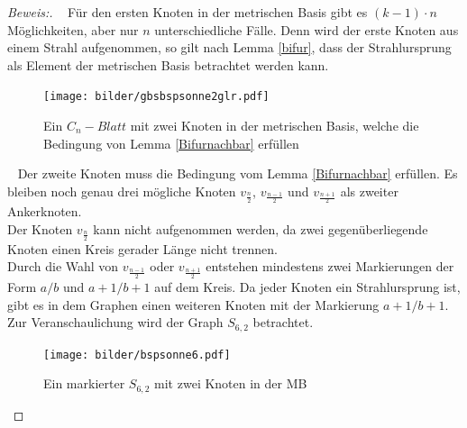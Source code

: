 \begin{proof}[Beweis:]~
Für den ersten Knoten in der metrischen Basis gibt es $(k-1)\cdot n$ Möglichkeiten, aber nur $n$ unterschiedliche Fälle. Denn wird der erste Knoten aus einem Strahl aufgenommen, so gilt nach Lemma \ref{bifur}, dass der Strahlursprung als Element der metrischen Basis betrachtet werden kann.\\
\vspace{-8mm}
 \begin{figure}[h!]
		\centering
 		 \texttt{[image: bilder/gbsbspsonne2glr.pdf]}
   \caption{Ein $C_{n}-Blatt$ mit zwei Knoten in der metrischen Basis, welche die Bedingung von Lemma \ref{Bifurnachbar} erfüllen}
  	 \end{figure}
\vspace{-4mm}
  	 ~\linebreak
Der zweite Knoten muss die Bedingung vom Lemma \ref{Bifurnachbar} erfüllen. Es bleiben noch genau drei mögliche Knoten $v_{\frac{n}{2}}$, $v_{\frac{n-1}{2}}$ und $v_{\frac{n+1}{2}}$ als zweiter Ankerknoten.\\ 
Der Knoten $v_{\frac{n}{2}}$ kann nicht aufgenommen werden, da zwei gegenüberliegende Knoten einen Kreis gerader Länge nicht trennen.\\
Durch die Wahl von $v_{\frac{n-1}{2}}$ oder $v_{\frac{n+1}{2}}$ entstehen mindestens zwei Markierungen der Form $a/b$ und $a+1/b+1$ auf dem Kreis. Da jeder Knoten ein Strahlursprung ist, gibt es in dem Graphen einen weiteren Knoten mit der Markierung $a+1/b+1$. Zur Veranschaulichung wird der Graph $S_{6,2}$ betrachtet.
\begin{figure}[h!]
		\centering
 		 \texttt{[image: bilder/bspsonne6.pdf]}
   \caption{Ein markierter $S_{6,2}$ mit zwei Knoten in der MB}
  	 \end{figure}
\end{proof}
